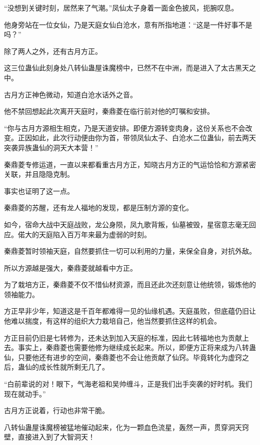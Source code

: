 
\begin{this_body}



“没想到关键时刻，居然来了气潮。”凤仙太子身着一面金色披风，扼腕叹息。

他身旁站在一位女仙，乃是天庭女仙白沧水，意有所指地道：“这是一件好事不是吗？”

除了两人之外，还有古月方正。

这三位蛊仙此刻身处八转仙蛊屋诛魔榜中，已然不在中洲，而是进入了太古黑天之中。

古月方正神色微动，知道白沧水话外之音。

他不禁回想起此次离开天庭时，秦鼎菱在临行前对他的叮嘱和安排。

“你与古月方源相生相克，乃是天道安排。即便方源转变肉身，这份关系也不会改变。正因如此，此次行动便由你为首，带领凤仙太子、白沧水二位蛊仙，前去两天突袭异族蛊仙的洞天大本营！”

秦鼎菱专修运道，一直以来都看重古月方正，知晓古月方正的气运恰恰和方源紧密关联，并且隐隐克制。

事实也证明了这一点。

秦鼎菱的苏醒，还有龙人福地的发现，都是压制方源的变化。

如今，宿命大战中天庭战败，龙公身陨，凤九歌背叛，仙墓被毁，星宿意志毫无回应。偌大的天庭陷入百万年来最为虚弱的时刻。

秦鼎菱暂时领袖天庭，自然要抓住一切可以利用的力量，来保全自身，对抗外敌。

所以方源越是强大，秦鼎菱就越看中方正。

为了栽培方正，秦鼎菱不仅不惜仙材资源，而且还此次还刻意让他统领，锻炼他的领袖能力。

方正早非少年，知道这是千百年都难得一见的仙缘机遇。天庭虽败，但底蕴仍旧让他难以揣度，有这样的组织大力栽培自己，他当然要抓住这样的机会。

方正目前仍旧是七转修为，还未达到加入天庭的标准，因此七转福地也为贡献上去。事实上，秦鼎菱也需要他修为继续成长起来。所以，即便方正将来成为八转蛊仙，只要他还有进步的空间，秦鼎菱也不会让他贡献了仙窍。毕竟转化为虚窍之后，蛊仙的成长性就所剩无几了。

“白前辈说的对！眼下，气海老祖和吴帅缠斗，正是我们出手突袭的好时机。我们现在就动手。”

古月方正说着，行动也非常干脆。

八转仙蛊屋诛魔榜被猛地催动起来，化为一颗血色流星，轰然一声，贯穿洞天窍壁，直接进入到了大智洞天！


\end{this_body}

